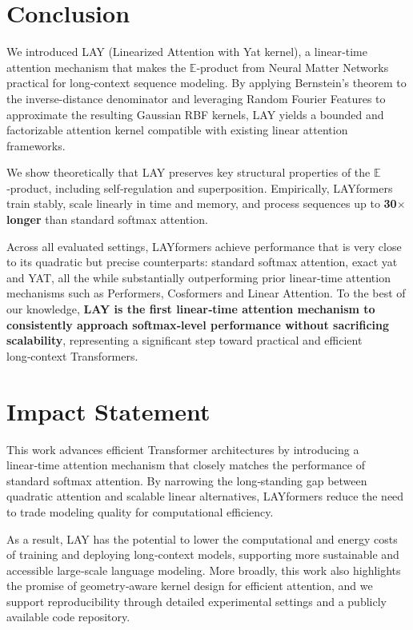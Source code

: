 \documentclass{article}
\begin{document}
\section{Conclusion}
\label{sec:conclusion}

We introduced LAY (Linearized Attention with Yat kernel), a linear‑time attention mechanism that makes the $\mathbb{E}$‑product from Neural Matter Networks practical for long‑context sequence modeling. By applying Bernstein's theorem to the inverse-distance denominator and leveraging Random Fourier Features to approximate the resulting Gaussian RBF kernels, LAY yields a bounded and factorizable attention kernel compatible with existing linear attention frameworks.

We show theoretically that LAY preserves key structural properties of the $\mathbb{E}$‑product, including self‑regulation and superposition. Empirically, LAYformers train stably, scale linearly in time and memory, and process sequences up to \textbf{30$\times$ longer} than standard softmax attention.

Across all evaluated settings, LAYformers achieve performance that is very close to its quadratic but precise counterparts: standard softmax attention, exact yat and YAT, all the while substantially outperforming prior linear‑time attention mechanisms such as Performers, Cosformers and Linear Attention. To the best of our knowledge, \textbf{LAY is the first linear‑time attention mechanism to consistently approach softmax‑level performance without sacrificing scalability}, representing a significant step toward practical and efficient long‑context Transformers.

\section*{Impact Statement}

This work advances efficient Transformer architectures by introducing a linear‑time attention mechanism that closely matches the performance of standard softmax attention. By narrowing the long‑standing gap between quadratic attention and scalable linear alternatives, LAYformers reduce the need to trade modeling quality for computational efficiency.

As a result, LAY has the potential to lower the computational and energy costs of training and deploying long‑context models, supporting more sustainable and accessible large‑scale language modeling. More broadly, this work also highlights the promise of geometry‑aware kernel design for efficient attention, and we support reproducibility through detailed experimental settings and a publicly available code repository.


\end{document}
